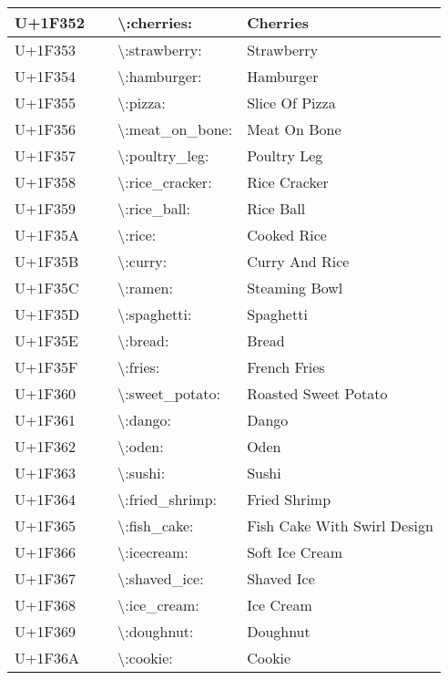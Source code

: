 \begin{table}[h]
\begin{tabulary}{\linewidth}{|L|L|L|L|}
\hline
U+1F352 & 🍒 & {\textbackslash}:cherries: & Cherries \\
\hline
U+1F353 & 🍓 & {\textbackslash}:strawberry: & Strawberry \\
\hline
U+1F354 & 🍔 & {\textbackslash}:hamburger: & Hamburger \\
\hline
U+1F355 & 🍕 & {\textbackslash}:pizza: & Slice Of Pizza \\
\hline
U+1F356 & 🍖 & {\textbackslash}:meat\_on\_bone: & Meat On Bone \\
\hline
U+1F357 & 🍗 & {\textbackslash}:poultry\_leg: & Poultry Leg \\
\hline
U+1F358 & 🍘 & {\textbackslash}:rice\_cracker: & Rice Cracker \\
\hline
U+1F359 & 🍙 & {\textbackslash}:rice\_ball: & Rice Ball \\
\hline
U+1F35A & 🍚 & {\textbackslash}:rice: & Cooked Rice \\
\hline
U+1F35B & 🍛 & {\textbackslash}:curry: & Curry And Rice \\
\hline
U+1F35C & 🍜 & {\textbackslash}:ramen: & Steaming Bowl \\
\hline
U+1F35D & 🍝 & {\textbackslash}:spaghetti: & Spaghetti \\
\hline
U+1F35E & 🍞 & {\textbackslash}:bread: & Bread \\
\hline
U+1F35F & 🍟 & {\textbackslash}:fries: & French Fries \\
\hline
U+1F360 & 🍠 & {\textbackslash}:sweet\_potato: & Roasted Sweet Potato \\
\hline
U+1F361 & 🍡 & {\textbackslash}:dango: & Dango \\
\hline
U+1F362 & 🍢 & {\textbackslash}:oden: & Oden \\
\hline
U+1F363 & 🍣 & {\textbackslash}:sushi: & Sushi \\
\hline
U+1F364 & 🍤 & {\textbackslash}:fried\_shrimp: & Fried Shrimp \\
\hline
U+1F365 & 🍥 & {\textbackslash}:fish\_cake: & Fish Cake With Swirl Design \\
\hline
U+1F366 & 🍦 & {\textbackslash}:icecream: & Soft Ice Cream \\
\hline
U+1F367 & 🍧 & {\textbackslash}:shaved\_ice: & Shaved Ice \\
\hline
U+1F368 & 🍨 & {\textbackslash}:ice\_cream: & Ice Cream \\
\hline
U+1F369 & 🍩 & {\textbackslash}:doughnut: & Doughnut \\
\hline
U+1F36A & 🍪 & {\textbackslash}:cookie: & Cookie \\

\end{tabulary}
\end{table}
